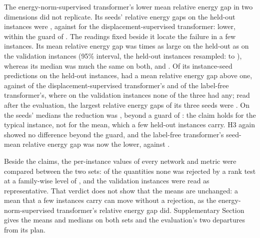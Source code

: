 The energy-norm-supervised transformer's lower mean relative energy gap in two dimensions
did not replicate. Its seeds' relative energy gaps on the held-out instances were
\numHoldHTwoANewSeeds{}, against \numHoldHTwoABaseSeeds{} for the displacement-supervised
transformer: \numHoldHTwoARel{} lower, within the guard of \numHoldHTwoATau{}. The readings
fixed beside it locate the failure in a few instances. Its mean relative energy gap was
\numHoldHTwoARatio{} times as large on the held-out as on the validation instances (95\%
interval, the held-out instances resampled: \numHoldHTwoARatioLow{} to
\numHoldHTwoARatioHigh{}), whereas its median was much the same on both,
\numHoldHTwoAMedHold{} and \numHoldHTwoAMedVal{}. Of its \numHoldTwoPairs{} instance-seed
predictions on the held-out instances, \numHoldTwoWorseInstKnorm{} had a mean relative
energy gap above one, against \numHoldTwoWorseInstLab{} of the displacement-supervised
transformer's and \numHoldTwoWorseInstFree{} of the label-free transformer's, where on the
validation instances none of the three had any; read after the evaluation, the largest
relative energy gaps of its three seeds were \numHoldHTwoATopSeeds{}. On the seeds' medians
the reduction was \numHoldHTwoAMedRel{}, beyond a guard of \numHoldHTwoAMedTau{}: the claim
holds for the typical instance, not for the mean, which a few held-out instances carry. H3
again showed no difference beyond the guard, and the label-free transformer's seed-mean
relative energy gap was now the lower, \numHoldTwoFreeGap{} against \numHoldTwoKnormGap{}.

Beside the claims, the per-instance values of every network and metric were compared between
the two sets: of the \numHoldVQuantities{} quantities none was rejected by a rank test at a
family-wise level of \numHoldVAlpha{}, and the validation instances were read as
representative. That verdict does not show that the means are unchanged: a mean that a few
instances carry can move without a rejection, as the energy-norm-supervised transformer's
relative energy gap did. Supplementary Section~\SuppPrereg{} gives the means and medians on
both sets and the evaluation's two departures from its plan.
